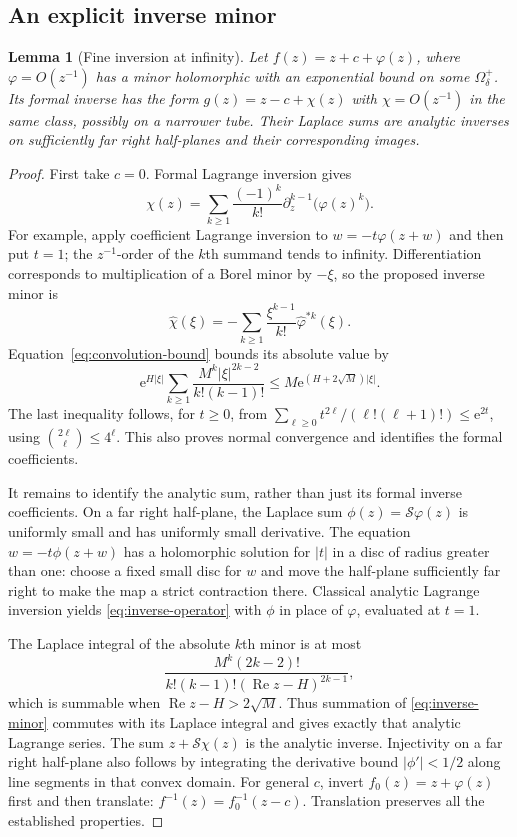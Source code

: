 \documentclass[11pt,a4paper]{article}
\numberwithin{equation}{section}
\newtheorem{lemma}[theorem]{Lemma}
\theoremstyle{definition}
\theoremstyle{remark}
\theoremstyle{definition}
\newcommand{\e}{\mathrm e}
\newcommand{\Ree}{\operatorname{Re}}
\begin{document}
\subsection{An explicit inverse minor}
\begin{lemma}[Fine inversion at infinity]
\label{lem:fine-inverse-infinity}
Let $f(z)=z+c+\varphi(z)$, where $\varphi=O(z^{-1})$ has a minor
holomorphic with an exponential bound on some $\Omega^+_\delta$.
Its formal inverse has the form $g(z)=z-c+\chi(z)$ with $\chi=O(z^{-1})$
in the same class, possibly on a narrower tube. Their Laplace sums are
analytic inverses on sufficiently far right half-planes and their
corresponding images.
\end{lemma}
\begin{proof}
First take $c=0$. Formal Lagrange inversion gives
\begin{equation}
 \chi(z)=\sum_{k\ge1}\frac{(-1)^k}{k!}
                       \partial_z^{k-1}\bigl(\varphi(z)^k\bigr).
 \label{eq:inverse-operator}
\end{equation}
For example, apply coefficient Lagrange inversion to
$w=-t\varphi(z+w)$ and then put $t=1$; the $z^{-1}$-order of the
$k$th summand tends to infinity. Differentiation corresponds to
multiplication of a Borel minor by $-\xi$, so the proposed inverse minor
is
\begin{equation}
 \widehat\chi(\xi)=-\sum_{k\ge1}\frac{\xi^{k-1}}{k!}
                                     \widehat\varphi^{*k}(\xi).
 \label{eq:inverse-minor}
\end{equation}
Equation~\eqref{eq:convolution-bound} bounds its absolute value by
\[
 \e^{H|\xi|}\sum_{k\ge1}
       \frac{M^k|\xi|^{2k-2}}{k!(k-1)!}
 \le M\e^{(H+2\sqrt M)|\xi|}.
\]
The last inequality follows, for $t\ge0$, from
$\sum_{\ell\ge0}t^{2\ell}/(\ell!(\ell+1)!)\le\e^{2t}$,
using $\binom{2\ell}{\ell}\le4^\ell$.
This also proves normal convergence and identifies the formal
coefficients.

It remains to identify the analytic sum, rather than just its formal
inverse coefficients. On a far right half-plane, the Laplace sum
$\phi(z)=\mathcal S\varphi(z)$ is uniformly small and has uniformly
small derivative. The equation $w=-t\phi(z+w)$ has a holomorphic
solution for $|t|$ in a disc of radius greater than one: choose a fixed
small disc for $w$ and move the half-plane sufficiently far right to
make the map a strict contraction there. Classical analytic Lagrange
inversion yields \eqref{eq:inverse-operator} with $\phi$ in place of
$\varphi$, evaluated at $t=1$.

The Laplace integral of the absolute $k$th minor is at most
\[
 \frac{M^k(2k-2)!}{k!(k-1)!(\Ree z-H)^{2k-1}},
\]
which is summable when $\Ree z-H>2\sqrt M$.
Thus summation of \eqref{eq:inverse-minor} commutes with its Laplace
integral and gives exactly that analytic Lagrange series.
The sum $z+\mathcal S\chi(z)$ is the analytic inverse. Injectivity on
a far right half-plane also follows by integrating the derivative
bound $|\phi'|<1/2$ along line segments in that convex domain.
For general $c$, invert $f_0(z)=z+\varphi(z)$ first and then translate:
$f^{-1}(z)=f_0^{-1}(z-c)$. Translation preserves all the established
properties.
\end{proof}
\end{document}

